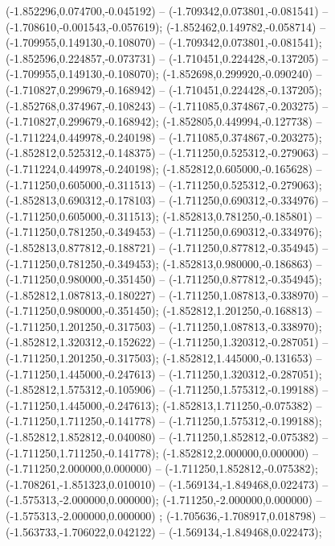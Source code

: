  (-1.852296,0.074700,-0.045192) -- (-1.709342,0.073801,-0.081541) -- (-1.708610,-0.001543,-0.057619);
 (-1.852462,0.149782,-0.058714) -- (-1.709955,0.149130,-0.108070) -- (-1.709342,0.073801,-0.081541);
 (-1.852596,0.224857,-0.073731) -- (-1.710451,0.224428,-0.137205) -- (-1.709955,0.149130,-0.108070);
 (-1.852698,0.299920,-0.090240) -- (-1.710827,0.299679,-0.168942) -- (-1.710451,0.224428,-0.137205);
 (-1.852768,0.374967,-0.108243) -- (-1.711085,0.374867,-0.203275) -- (-1.710827,0.299679,-0.168942);
 (-1.852805,0.449994,-0.127738) -- (-1.711224,0.449978,-0.240198) -- (-1.711085,0.374867,-0.203275);
 (-1.852812,0.525312,-0.148375) -- (-1.711250,0.525312,-0.279063) -- (-1.711224,0.449978,-0.240198);
 (-1.852812,0.605000,-0.165628) -- (-1.711250,0.605000,-0.311513) -- (-1.711250,0.525312,-0.279063);
 (-1.852813,0.690312,-0.178103) -- (-1.711250,0.690312,-0.334976) -- (-1.711250,0.605000,-0.311513);
 (-1.852813,0.781250,-0.185801) -- (-1.711250,0.781250,-0.349453) -- (-1.711250,0.690312,-0.334976);
 (-1.852813,0.877812,-0.188721) -- (-1.711250,0.877812,-0.354945) -- (-1.711250,0.781250,-0.349453);
 (-1.852813,0.980000,-0.186863) -- (-1.711250,0.980000,-0.351450) -- (-1.711250,0.877812,-0.354945);
 (-1.852812,1.087813,-0.180227) -- (-1.711250,1.087813,-0.338970) -- (-1.711250,0.980000,-0.351450);
 (-1.852812,1.201250,-0.168813) -- (-1.711250,1.201250,-0.317503) -- (-1.711250,1.087813,-0.338970);
 (-1.852812,1.320312,-0.152622) -- (-1.711250,1.320312,-0.287051) -- (-1.711250,1.201250,-0.317503);
 (-1.852812,1.445000,-0.131653) -- (-1.711250,1.445000,-0.247613) -- (-1.711250,1.320312,-0.287051);
 (-1.852812,1.575312,-0.105906) -- (-1.711250,1.575312,-0.199188) -- (-1.711250,1.445000,-0.247613);
 (-1.852813,1.711250,-0.075382) -- (-1.711250,1.711250,-0.141778) -- (-1.711250,1.575312,-0.199188);
 (-1.852812,1.852812,-0.040080) -- (-1.711250,1.852812,-0.075382) -- (-1.711250,1.711250,-0.141778);
 (-1.852812,2.000000,0.000000) -- (-1.711250,2.000000,0.000000) -- (-1.711250,1.852812,-0.075382);
 (-1.708261,-1.851323,0.010010) -- (-1.569134,-1.849468,0.022473) -- (-1.575313,-2.000000,0.000000);
 (-1.711250,-2.000000,0.000000) -- (-1.575313,-2.000000,0.000000) ;
 (-1.705636,-1.708917,0.018798) -- (-1.563733,-1.706022,0.042122) -- (-1.569134,-1.849468,0.022473);
